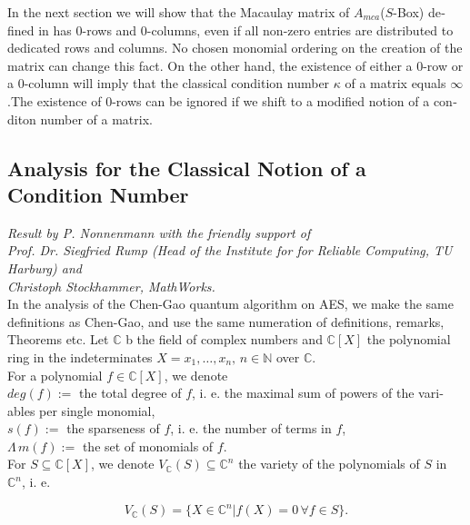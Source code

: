 \documentclass[a4paper,11pt]{article}
\begin{document}
\begin{otherlanguage}{english}
\noindent
In the next section we will show that the Macaulay matrix of $A_{mca}$($S$-Box) defined in \cite{QAA} has $0$-rows and $0$-columns, even if all non-zero entries are distributed to dedicated rows and columns. No chosen monomial ordering on the creation of the matrix can change this fact. On the other hand, the existence of either a $0$-row or a $0$-column will imply that the classical condition number $\kappa$ of a matrix equals $\infty$.The existence of $0$-rows can be ignored if we shift to a modified notion of a conditon number of a matrix. \\


\subsection{Analysis for the Classical Notion of a Condition Number}
\noindent 
{\small \textit{Result by P. Nonnenmann with the friendly support of \\
Prof. Dr. Siegfried Rump (Head of the Institute for for Reliable Computing, TU Harburg) and\\
Christoph Stockhammer, MathWorks.}}\\

\noindent
In the analysis of the Chen-Gao quantum algorithm on \textsc{AES}, we make the same definitions as Chen-Gao, and use the same numeration of definitions, remarks, Theorems  etc. Let $\mathbb{C}$ b the field of complex numbers and $\mathbb{C}[X]$ the polynomial ring in the indeterminates $X = x_1, \ldots, x_n, \, n \in \mathbb{N}$ over $\mathbb{C}$. \\

\noindent
For a polynomial $f \in \mathbb{C}[X]$, we denote \\

\noindent
$deg(f) :=$ the total degree of $f$, i. e. the maximal sum of powers of the variables per single monomial,\\
\noindent
$s(f) :=$ the sparseness of $f$, i. e. the number of terms in $f$, \\
\noindent
$\Lambda \, m(f) :=$ the set of monomials of $f$. \\

\noindent
For $S \subseteq \mathbb{C}[X]$, we denote $V_{\mathbb{C}}(S) \subseteq \mathbb{C}^n$ the variety of the polynomials of $S$ in $\mathbb{C}^n$, i. e. 

$$V_{\mathbb{C}}(S) = \{ X \in \mathbb{C}^n | f(X) = 0 \, \forall f \in S\}.$$
\vspace{0.1cm}


\end{otherlanguage}
\end{document}
